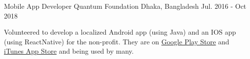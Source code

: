 

\begin{cventries}

  \cventry
    {Mobile App Developer} %
    {Quantum Foundation} %
    {Dhaka, Bangladesh} %
    {Jul. 2016 - Oct 2018} %
    {
      \begin{cvitems} %
        \item {Volunteered to develop a localized Android app (using Java) and an IOS app (using ReactNative) for the non-profit. They are on \href{https://play.google.com/store/apps/details?id=quantum.org.quran}{\color{blue}Google Play Store} and \href{https://itunes.apple.com/us/app/al-quran-bangla-mormobani/id1229434136?mt=8}{\color{blue}iTunes App Store} and being used by many.}
      \end{cvitems}
    }
\end{cventries}
